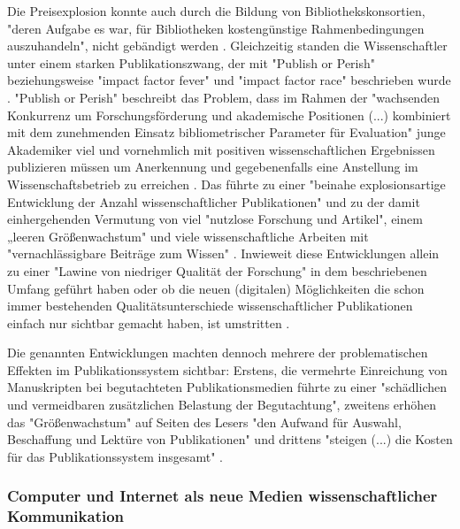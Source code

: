 Die Preisexplosion konnte auch durch die Bildung von Bibliothekskonsortien, "deren Aufgabe es war, für Bibliotheken kostengünstige Rahmenbedingungen auszuhandeln", nicht gebändigt werden \cite{Fladung_2003} \cite{Brintzinger_2010}. Gleichzeitig standen die Wissenschaftler unter einem starken Publikationszwang, der mit "Publish or Perish" \cite{CLAPHAM_2005} beziehungsweise "impact factor fever" \cite{Cherubini_2008} und "impact factor race" \cite{Brischoux_2009} beschrieben wurde \cite{offhaus_2012_institutionelle_repos}. "Publish or Perish" beschreibt das Problem, dass im Rahmen der "wachsenden Konkurrenz um Forschungsförderung und akademische Positionen (...) kombiniert mit dem zunehmenden Einsatz bibliometrischer Parameter für Evaluation" \cite{Fanelli_2010} junge Akademiker viel und vornehmlich mit positiven wissenschaftlichen Ergebnissen publizieren müssen um Anerkennung und gegebenenfalls eine Anstellung im Wissenschaftsbetrieb zu erreichen \cite{pscheida_2010_wikipedia} \cite{Beasley_2005} \cite{hamilton_1990_publishing}. Das führte zu einer "beinahe explosionsartige Entwicklung der Anzahl wissenschaftlicher Publikationen" \cite{bortz_Doering_2006_fragestellung} und zu der damit einhergehenden Vermutung von viel "nutzlose Forschung und Artikel"\cite{smith1990killing}, einem „leeren Größenwachstum" \cite{bbaw_publizieren_2015} und viele wissenschaftliche Arbeiten mit "vernachlässigbare Beiträge zum Wissen" \cite{hamilton_1990_publishing}. Inwieweit diese Entwicklungen allein zu einer "Lawine von niedriger Qualität der Forschung" \cite{Bauerlein_2010} in dem beschriebenen Umfang geführt haben oder ob die neuen (digitalen) Möglichkeiten die schon immer bestehenden Qualitätsunterschiede wissenschaftlicher Publikationen einfach nur sichtbar gemacht haben, ist umstritten \cite{rekdal_2014_academic}.

Die genannten Entwicklungen machten dennoch mehrere der problematischen Effekten im Publikationssystem sichtbar: Erstens, die vermehrte Einreichung von Manuskripten bei begutachteten Publikationsmedien führte zu einer "schädlichen und vermeidbaren zusätzlichen Belastung der Begutachtung", zweitens erhöhen das "Größenwachstum" auf Seiten des Lesers "den Aufwand für Auswahl, Beschaffung und Lektüre von Publikationen" und drittens "steigen (...) die Kosten für das Publikationssystem insgesamt" \cite{bbaw_publizieren_2015}.

\subsubsection{Computer und Internet als neue Medien wissenschaftlicher Kommunikation}

